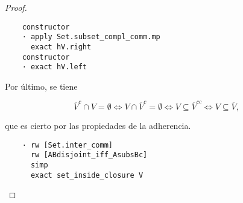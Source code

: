 \begin{proof}
\begin{lstlisting}
    constructor
    · apply Set.subset_compl_comm.mp
      exact hV.right
    constructor
    · exact hV.left
\end{lstlisting}

  Por último, se tiene

  $$
  \overline{V}^c \cap V = \emptyset \iff V \cap \overline{V}^c = \emptyset \iff
  V \subseteq \overline{V}^{cc} \iff V \subseteq \overline{V},
  $$

  que es cierto por las propiedades de la adherencia.

\begin{lstlisting}
    · rw [Set.inter_comm]
      rw [ABdisjoint_iff_AsubsBc]
      simp
      exact set_inside_closure V
\end{lstlisting}


\end{proof}